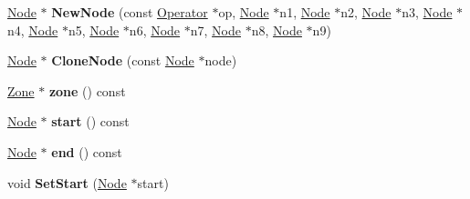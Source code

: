 \begin{DoxyCompactItemize}
\item 
\hyperlink{classv8_1_1internal_1_1compiler_1_1_node}{Node} $\ast$ {\bfseries New\+Node} (const \hyperlink{classv8_1_1internal_1_1compiler_1_1_operator}{Operator} $\ast$op, \hyperlink{classv8_1_1internal_1_1compiler_1_1_node}{Node} $\ast$n1, \hyperlink{classv8_1_1internal_1_1compiler_1_1_node}{Node} $\ast$n2, \hyperlink{classv8_1_1internal_1_1compiler_1_1_node}{Node} $\ast$n3, \hyperlink{classv8_1_1internal_1_1compiler_1_1_node}{Node} $\ast$n4, \hyperlink{classv8_1_1internal_1_1compiler_1_1_node}{Node} $\ast$n5, \hyperlink{classv8_1_1internal_1_1compiler_1_1_node}{Node} $\ast$n6, \hyperlink{classv8_1_1internal_1_1compiler_1_1_node}{Node} $\ast$n7, \hyperlink{classv8_1_1internal_1_1compiler_1_1_node}{Node} $\ast$n8, \hyperlink{classv8_1_1internal_1_1compiler_1_1_node}{Node} $\ast$n9)\hypertarget{classv8_1_1internal_1_1compiler_1_1_graph_abc971077689ea441f29d9b5afd5c2b62}{}\label{classv8_1_1internal_1_1compiler_1_1_graph_abc971077689ea441f29d9b5afd5c2b62}

\item 
\hyperlink{classv8_1_1internal_1_1compiler_1_1_node}{Node} $\ast$ {\bfseries Clone\+Node} (const \hyperlink{classv8_1_1internal_1_1compiler_1_1_node}{Node} $\ast$node)\hypertarget{classv8_1_1internal_1_1compiler_1_1_graph_a88ce3760d278b92aa6ce3e356af380f3}{}\label{classv8_1_1internal_1_1compiler_1_1_graph_a88ce3760d278b92aa6ce3e356af380f3}

\item 
\hyperlink{classv8_1_1internal_1_1_zone}{Zone} $\ast$ {\bfseries zone} () const \hypertarget{classv8_1_1internal_1_1compiler_1_1_graph_a88ff00acca5d86122652aab27a1acdb0}{}\label{classv8_1_1internal_1_1compiler_1_1_graph_a88ff00acca5d86122652aab27a1acdb0}

\item 
\hyperlink{classv8_1_1internal_1_1compiler_1_1_node}{Node} $\ast$ {\bfseries start} () const \hypertarget{classv8_1_1internal_1_1compiler_1_1_graph_a664f31cdeaec4b46876816b78d1b6ad7}{}\label{classv8_1_1internal_1_1compiler_1_1_graph_a664f31cdeaec4b46876816b78d1b6ad7}

\item 
\hyperlink{classv8_1_1internal_1_1compiler_1_1_node}{Node} $\ast$ {\bfseries end} () const \hypertarget{classv8_1_1internal_1_1compiler_1_1_graph_addbb77c66418c62a0cd68af4134bd929}{}\label{classv8_1_1internal_1_1compiler_1_1_graph_addbb77c66418c62a0cd68af4134bd929}

\item 
void {\bfseries Set\+Start} (\hyperlink{classv8_1_1internal_1_1compiler_1_1_node}{Node} $\ast$start)\hypertarget{classv8_1_1internal_1_1compiler_1_1_graph_abc339cd062989332e6b478e5dd44115e}{}\label{classv8_1_1internal_1_1compiler_1_1_graph_abc339cd062989332e6b478e5dd44115e}


\end{DoxyCompactItemize}

